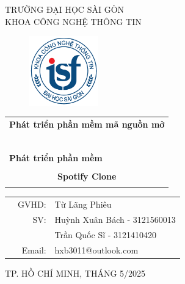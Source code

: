 \documentclass[a4paper]{article}
\begin{document}
\begin{titlepage}
\begin{center}
TRƯỜNG ĐẠI HỌC SÀI GÒN \\
KHOA CÔNG NGHỆ THÔNG TIN
\end{center}
\vspace{1cm}

\begin{figure}[h!]
\begin{center}
\includegraphics[width=3cm]{logoITSGU.png}
\end{center}
\end{figure}

\vspace{1cm}


\begin{center}
\begin{tabular}{c}
	\multicolumn{1}{l}{\textbf{{\Large Phát triển phần mềm mã nguồn mở}}}\\
	~~\\
	\hline
	\\
	\multicolumn{1}{l}{\textbf{{\Large Phát triển phần mềm }}}\\
	\\
	
	\textbf{{\Huge Spotify Clone}}\\
	\\
	\hline
\end{tabular}
\end{center}

\vspace{3cm}

\begin{table}[h]
\begin{tabular}{rrl}
\hspace{5 cm} & GVHD: &Từ Lãng Phiêu\\
& SV: & Huỳnh Xuân Bách - 3121560013\\
& & Trần Quốc Sĩ - 3121410420 \\
& Email: & hxb3011@outlook.com \\
\end{tabular}
\vspace{1.5 cm}
\end{table}

\begin{center}

{\footnotesize TP. HỒ CHÍ MINH, THÁNG 5/2025}
\end{center}
\end{titlepage}
\end{document}
